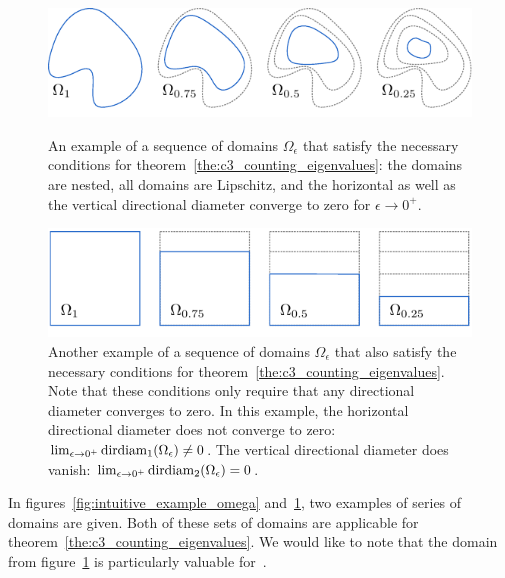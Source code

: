 \begin{figure}[t]
  \begin{center}
    \includegraphics[width=\linewidth]{img/chapter3/counting/main-theorem-omega.pdf}
    \caption{\label{fig:intuitive_example_omega} An example of a sequence of domains $\Omega_\epsilon$ that satisfy the necessary conditions for theorem~\ref{the:c3_counting_eigenvalues}: the domains are nested, all domains are Lipschitz, and the horizontal as well as the vertical directional diameter converge to zero for $\epsilon \to 0^{+}$.}
  \end{center}

  \begin{center}
    \includegraphics[width=\linewidth]{img/chapter3/counting/main-theorem-rho.pdf}
    \caption{\label{fig:intuitive_example_rho} Another example of a sequence of domains $\Omega_\epsilon$ that also satisfy the necessary conditions for theorem~\ref{the:c3_counting_eigenvalues}. Note that these conditions only require that any directional diameter converges to zero. In this example, the horizontal directional diameter does not converge to zero: $\lim_{\epsilon \to 0^+}\operatorname{dirdiam}_1(\Omega_\epsilon) \neq 0$. The vertical directional diameter does vanish: $\lim_{\epsilon \to 0^+}\operatorname{dirdiam}_2(\Omega_\epsilon) = 0$.}
  \end{center}
\end{figure}

In figures~\ref{fig:intuitive_example_omega} and~\ref{fig:intuitive_example_rho}, two examples of series of domains are given. Both of these sets of domains are applicable for theorem~\ref{the:c3_counting_eigenvalues}. We would like to note that the domain from figure~\ref{fig:intuitive_example_rho} is particularly valuable for~\cite{ixaru_new_2010,baeyens_improvements_2022}.

